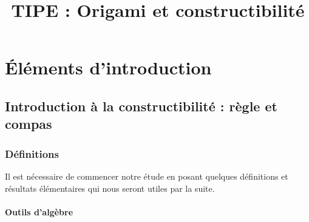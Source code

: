 \documentclass[a4paper,12pt,french]{report}
\title{TIPE : Origami et constructibilité}
\begin{document}
\maketitle
\renewcommand{\contentsname}{Sommaire}
\tableofcontents{}

\part{Éléments d'introduction}
\chapter{Introduction à la constructibilité : règle et compas}
	
	\section{Définitions}
		Il est nécessaire de commencer notre étude en posant quelques définitions et résultats élémentaires qui nous seront utiles par la suite.
		\subsection{Outils d'algèbre}
			
\end{document}
